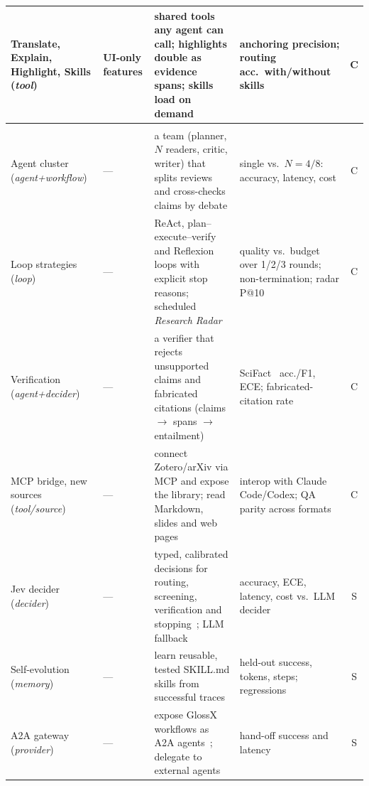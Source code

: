 \documentclass{article}
\newcommand{\rowrule}{\arrayrulecolor{glgray!45}\specialrule{0.25pt}{0.6pt}{0.9pt}\arrayrulecolor{black}}
\newcommand{\sysname}{GlossX}
\begin{document}
\begin{table}[!t]
\begin{tabularx}{\textwidth}{@{}>{\raggedright\arraybackslash}p{2.45cm}>{\raggedright\arraybackslash}p{1.95cm}>{\raggedright\arraybackslash}X>{\raggedright\arraybackslash}p{3.45cm}c@{}}
    \rowrule
    Translate, Explain, Highlight, Skills (\textit{tool}) & UI-only features & shared tools any agent can call; highlights double as evidence spans; skills load on demand & anchoring precision; routing acc.\ with/without skills & C \\
    \midrule
    \rowcolor{glpurple!7}\multicolumn{5}{@{}l}{\textit{New plugins: what they aim to do}} \\
    \rowrule
    Agent cluster (\textit{agent+workflow}) & --- & a team (planner, $N$ readers, critic, writer) that splits reviews and cross-checks claims by debate & single vs.\ $N{=}4/8$: accuracy, latency, cost & C \\
    \rowrule
    Loop strategies (\textit{loop}) & --- & ReAct, plan--execute--verify and Reflexion~\cite{shinn2023reflexion} loops with explicit stop reasons; scheduled \emph{Research Radar} & quality vs.\ budget over 1/2/3 rounds; non-termination; radar P@10 & C \\
    \rowrule
    Verification (\textit{agent+decider}) & --- & a verifier that rejects unsupported claims and fabricated citations (claims $\to$ spans $\to$ entailment) & SciFact~\cite{wadden2020scifact} acc./F1, ECE; fabricated-citation rate & C \\
    \rowrule
    MCP bridge, new sources (\textit{tool/source}) & --- & connect Zotero/arXiv via MCP and expose the library; read Markdown, slides and web pages & interop with Claude Code/Codex; QA parity across formats & C \\
    \rowrule
    Jev decider (\textit{decider}) & --- & typed, calibrated decisions for routing, screening, verification and stopping~\cite{jev2026}; LLM fallback & accuracy, ECE, latency, cost vs.\ LLM decider & S \\
    \rowrule
    Self-evolution (\textit{memory}) & --- & learn reusable, tested SKILL.md skills from successful traces & held-out success, tokens, steps; regressions & S \\
    \rowrule
    A2A gateway (\textit{provider}) & --- & expose \sysname{} workflows as A2A agents~\cite{a2a2025}; delegate to external agents & hand-off success and latency & S \\
    \bottomrule
  \end{tabularx}
  \vspace{-8pt}
\end{table}
\end{document}
